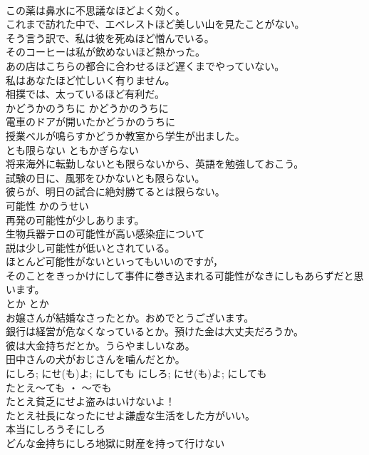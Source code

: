 \documentclass[8pt]{extreport}
\begin{document}
\begin{CJK}{UTF8}{min}
\\	この薬は鼻水に不思議なほどよく効く。  
\\	これまで訪れた中で、エベレストほど美しい山を見たことがない。  
\\	そう言う訳で、私は彼を死ぬほど憎んでいる。  
\\	そのコーヒーは私が飲めないほど熱かった。  
\\	あの店はこちらの都合に合わせるほど遅くまでやっていない。  
\\	私はあなたほど忙しいく有りません。　  
\\	相撲では、太っているほど有利だ。  
\\	かどうかのうちに	かどうかのうちに	
\\	電車のドアが開いたかどうかのうちに  
\\	授業ベルが鳴らすかどうか教室から学生が出ました。  
\\	とも限らない	ともかぎらない	
\\	将来海外に転勤しないとも限らないから、英語を勉強しておこう。  
\\	試験の日に、風邪をひかないとも限らない。  
\\	彼らが、明日の試合に絶対勝てるとは限らない。  
\\	可能性	かのうせい	
\\	再発の可能性が少しあります。  
\\	生物兵器テロの可能性が高い感染症について  
\\	説は少し可能性が低いとされている。  
\\	ほとんど可能性がないといってもいいのですが，  
\\	そのことをきっかけにして事件に巻き込まれる可能性がなきにしもあらずだと思います。  
\\	とか	とか	
\\	お嬢さんが結婚なさったとか。おめでとうございます。   
\\	銀行は経営が危なくなっているとか。預けた金は大丈夫だろうか。   
\\	彼は大金持ちだとか。うらやましいなあ。  
\\	田中さんの犬がおじさんを噛んだとか。   
\\	にしろ; にせ(も)よ; にしても	にしろ; にせ(も)よ; にしても	
\\	たとえ〜ても ・ 〜でも	
\\	たとえ貧乏にせよ盗みはいけないよ！  
\\	たとえ社長になったにせよ謙虚な生活をした方がいい。  
\\	本当にしろうそにしろ  
\\	どんな金持ちにしろ地獄に財産を持って行けない  

\end{CJK}
\end{document}

